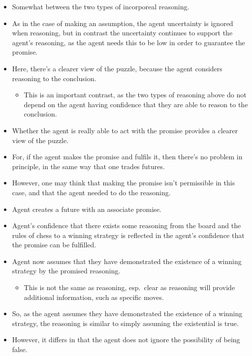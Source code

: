 \documentclass[10pt]{article}
\begin{document}
\begin{note}
  \begin{itemize}
  \item Somewhat between the two types of incorporeal reasoning.
  \item As in the case of making an assumption, the agent uncertainty is ignored when reasoning, but in contrast the uncertainty continues to support the agent's reasoning, as the agent needs this to be low in order to guarantee the promise.
  \item Here, there's a clearer view of the puzzle, because the agent considers reasoning to the conclusion.
    \begin{itemize}
    \item This is an important contrast, as the two types of reasoning above do not depend on the agent having confidence that they are able to reason to the conclusion.
    \end{itemize}
  \item Whether the agent is really able to act with the promise provides a clearer view of the puzzle.
  \item For, if the agent makes the promise and fulfils it, then there's no problem in principle, in the same way that one trades futures.
  \item However, one may think that making the promise isn't permissible in this case, and that the agent needed to do the reasoning.
  \end{itemize}
\end{note}
\begin{itemize}
\item Agent creates a future with an associate promise.
\item Agent's confidence that there exists some reasoning from the board and the rules of chess to a winning strategy is reflected in the agent's confidence that the promise can be fulfilled.
\item Agent now assumes that they have demonstrated the existence of a winning strategy by the promised reasoning.
  \begin{itemize}
  \item This is not the same as reasoning, esp.\ clear as reasoning will provide additional information, such as specific moves.
  \end{itemize}
\item So, as the agent assumes they have demonstrated the existence of a winning strategy, the reasoning is similar to simply assuming the existential is true.
\item However, it differs in that the agent does not ignore the possibility of being false.
\end{itemize}
\end{document}
